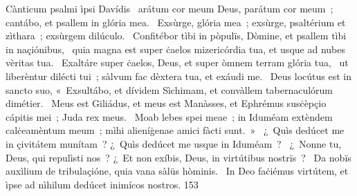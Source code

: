 { Cànticum psalmi ìpsi Davídis}
{%
~arátum cor meum Deus, parátum cor meum~; cantábo, et psallem in glória mea. 
~Exsùrge, glória mea~; exsùrge, psaltérium et zìthara~; exsùrgem dilúculo. 
~Confitébor tìbi in pòpulïs, Dòmine, et psallem tìbi in naçiónibus, 
~quia magna est super ċaelos mizericórdia tua, et usque ad nubes vèritas tua. 
~Exaltáre super ċaelos, Deus, et super òmnem terram glória tua, 
~ut liberèntur dilécti tui~; sàlvum fac dèxtera tua, et exáudi me. 
~Deus locútus est in sancto suo, «~Exsultábo, et dívidem Sìchimam, et convàllem tabernaculórum dimétier. 
~Meus est Giliádus, et meus est Manàsses, et Ephrémus susċèpçio cápitis mei~; Juda rex meus. 
~Moab lebes spei meae~; in Iduméam extèndem calċeamèntum meum~; mìhi alieníġenae amici fàcti sunt.~»
~¿~Quìs dedúcet me in çivitátem munítam~? ¿~Quìs dedúcet me usque in Iduméam~? 
~¿~Nonne tu, Deus, qui repulìsti nos~? ¿~Et non exíbis, Deus, in virtútibus nostrïs~? 
~Da nobïs auxìlium de tribulaçióne, quia vana sàlüs hòminis. 
~In Deo faċiémus virtútem, et ìpse ad nìhilum dedúcet inimícos nostros. 
}
{15}{3}
